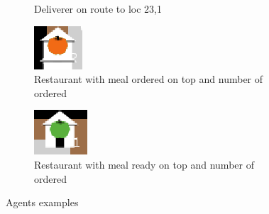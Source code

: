 \begin{figure}
\begin{subfigure}[m]{0.1\textwidth}
         \caption{Deliverer on route to loc 23,1}
     \end{subfigure}
     \hfill
     \begin{subfigure}[m]{0.1\textwidth}
         \centering
         \includegraphics[width=\textwidth]{sections/pics/meal_prep}
         \caption{Restaurant with meal ordered on top and number of ordered}
     \end{subfigure}
      \hfill
     \begin{subfigure}[m]{0.1\textwidth}
         \centering
         \includegraphics[width=\textwidth]{sections/pics/meal_ready}
         \caption{Restaurant with meal ready on top and number of ordered}
     \end{subfigure}
        \caption{Agents examples}
        \label{fig:agents}
\end{figure}






